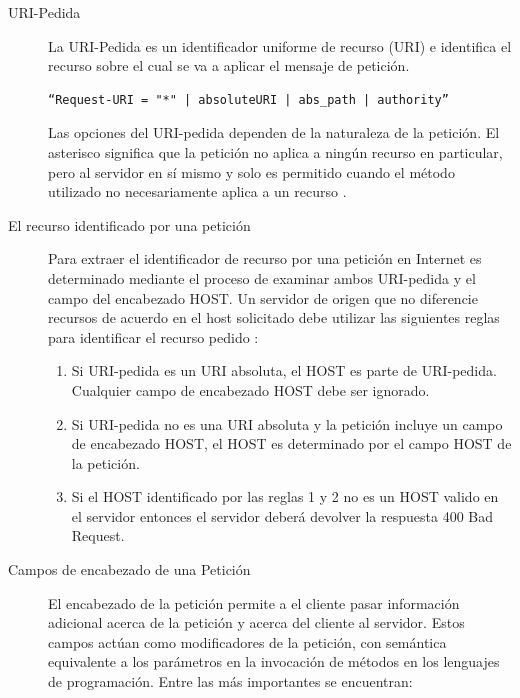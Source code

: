 \begin{description}
\item[URI-Pedida]
La URI-Pedida es un identificador uniforme de recurso (URI) e identifica el recurso sobre el cual se va a aplicar el mensaje de petición.
\begin{verbatim}
“Request-URI = "*" | absoluteURI | abs_path | authority”
\end{verbatim}

Las opciones del URI-pedida dependen de la naturaleza de la petición. El asterisco significa que la petición no aplica a ningún recurso en particular, pero al servidor en sí mismo y solo es permitido cuando el método utilizado no necesariamente aplica a un recurso \cite{rfc2616}.

\item[El recurso identificado por una petición]

Para extraer el identificador de recurso por una petición en Internet es determinado mediante el proceso de examinar ambos URI-pedida y el campo del encabezado HOST.
Un servidor de origen que no diferencie recursos de acuerdo en el host solicitado debe utilizar las siguientes reglas para identificar el recurso pedido \cite{rfc2616}:
\begin{enumerate}
\item Si URI-pedida es un URI absoluta, el HOST es parte de URI-pedida. Cualquier campo de encabezado HOST debe ser ignorado.
\item Si URI-pedida no es una URI absoluta y la petición incluye un campo de encabezado HOST, el HOST es determinado por el campo HOST de la petición. 
\item Si el HOST identificado por las reglas 1 y 2 no es un HOST valido en el servidor entonces el servidor deberá devolver la respuesta 400 Bad Request.
\end{enumerate}

\item[Campos de encabezado de una Petición]

El encabezado de la petición permite a el cliente pasar información adicional acerca de la petición y acerca del cliente al servidor. Estos campos actúan como modificadores de la petición, con semántica equivalente a los parámetros en la invocación de métodos en los lenguajes de programación. Entre las más importantes se encuentran:


\end{description}
